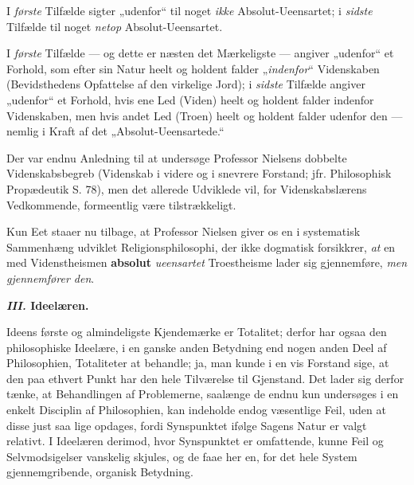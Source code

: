 \documentclass[12pt,a4paper]{book}
\newcommand{\opage}[1]{\marginnote{\footnotesize\textit{[#1]}}}
\begin{document}
I \emph{første} Tilfælde sigter „udenfor“ til noget \emph{ikke}
Absolut-Ueensartet; i \emph{sidste} Tilfælde til noget \emph{netop}
Absolut-Ueensartet.

I \emph{første} Tilfælde --- og dette er næsten det
Mærkeligste --- angiver „udenfor“ et Forhold, som efter
sin Natur heelt og holdent falder „\emph{indenfor}“ Videnskaben
(Bevidsthedens Opfattelse af den virkelige Jord);
i \emph{sidste} Tilfælde angiver „udenfor“ et Forhold, hvis
ene Led (Viden) heelt og holdent falder indenfor Videnskaben,
men hvis andet Led (Troen) heelt og holdent
falder udenfor den --- nemlig i Kraft af det „Absolut-Ueensartede.“

Der var endnu Anledning til at undersøge Professor
Nielsens dobbelte Videnskabsbegreb (Videnskab i
videre og i snevrere Forstand; jfr. Philosophisk Propædeutik
S. 78), men det allerede Udviklede vil, for Videnskabslærens
Vedkommende, formeentlig være tilstrækkeligt.

Kun Eet staaer nu tilbage, at Professor Nielsen
giver os en i systematisk Sammenhæng udviklet Religionsphilosophi,
der ikke dogmatisk forsikkrer, \emph{at} en med
Videnstheismen \textbf{absolut} \emph{ueensartet} Troestheisme lader
sig gjennemføre, \emph{men gjennemfører den}.
\opage{39}\setcounter{footnote}{0}%
\begin{center}\textbf{\textit{III.} Ideelæren.}\end{center}

Ideens første og almindeligste Kjendemærke er
Totalitet; derfor har ogsaa den philosophiske Ideelære,
i en ganske anden Betydning end nogen anden
Deel af Philosophien, Totaliteter at behandle; ja, man
kunde i en vis Forstand sige, at den paa ethvert Punkt
har den hele Tilværelse til Gjenstand. Det lader sig
derfor tænke, at Behandlingen af Problemerne, saalænge
de endnu kun undersøges i en enkelt Disciplin af Philosophien,
kan indeholde endog væsentlige Feil, uden at
disse just saa lige opdages, fordi Synspunktet ifølge
Sagens Natur er valgt relativt. I Ideelæren derimod,
hvor Synspunktet er omfattende, kunne Feil og Selvmodsigelser
vanskelig skjules, og de faae her en, for det
hele System gjennemgribende, organisk Betydning.
\end{document}
